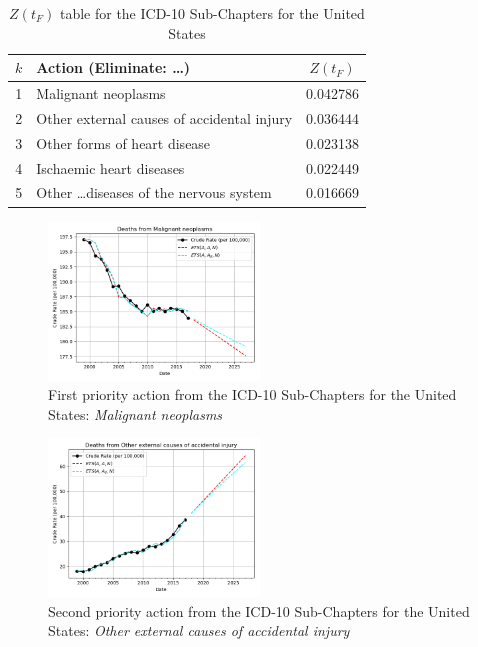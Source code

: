 \documentclass[10pt, a4paper, twocolumn]{IEEEconf}
\begin{document}
\begin{table}[H]
  \centering
  \begin{tabular}{clc}
    \toprule
      $k$ & Action (Eliminate: \ldots) & $Z(t_F)$ \\
    \midrule
      1 &                               Malignant neoplasms & 0.042786 \\
      2 &        Other external causes of accidental injury & 0.036444 \\
      3 &                      Other forms of heart disease & 0.023138 \\
      4 &                          Ischaemic heart diseases & 0.022449 \\
      5 &       Other \ldots diseases of the nervous system & 0.016669 \\
    \bottomrule
  \end{tabular}
  \caption{$Z(t_F)$ table for the ICD-10 Sub-Chapters for the United States}
  \label{table:ztable6}
\end{table}

\begin{figure}[H]
  \centering
  \includegraphics[width=0.5\textwidth]{results/US_ICD10_SUB_CHAPTERS/Malignant_neoplasms_ets.png}
  \caption{First priority action from the ICD-10 Sub-Chapters for the United States: \textit{Malignant neoplasms}}\label{fig:k6a}
\end{figure}
  
\begin{figure}[H]
  \centering
  \includegraphics[width=0.5\textwidth]{results/US_ICD10_SUB_CHAPTERS/Other_external_causes_of_accidental_injury_ets.png}
  \caption{Second priority action from the ICD-10 Sub-Chapters for the United States: \textit{Other external causes of accidental injury}}\label{fig:k6b}
\end{figure}
  
\end{document}

